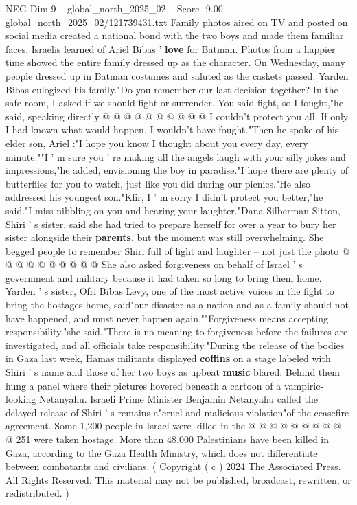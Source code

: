 \begin{textsample}{NEG Dim 9 – global\_north\_2025\_02 – Score -9.00 – global\_north\_2025\_02/121739431.txt}
Family photos aired on TV and posted on social media created a national bond with the two boys and made them familiar faces.
Israelis learned of Ariel Bibas ' \textbf{love} for Batman.
Photos from a happier time showed the entire family dressed up as the character.
On Wednesday, many people dressed up in Batman costumes and saluted as the caskets passed.
Yarden Bibas eulogized his family."Do you remember our last decision together?
In the safe room, I asked if we should fight or surrender.
You said fight, so I fought,"he said, speaking directly @ @ @ @ @ @ @ @ @ @ I couldn't protect you all.
If only I had known what would happen, I wouldn't have fought."Then he spoke of his elder son, Ariel :"I hope you know I thought about you every day, every minute.""I ' m sure you ' re making all the angels laugh with your silly jokes and impressions,"he added, envisioning the boy in paradise."I hope there are plenty of butterflies for you to watch, just like you did during our picnics."He also addressed his youngest son."Kfir, I ' m sorry I didn't protect you better,"he said."I miss nibbling on you and hearing your laughter."Dana Silberman Sitton, Shiri ' s sister, said she had tried to prepare herself for over a year to bury her sister alongside their \textbf{parents}, but the moment was still overwhelming.
She begged people to remember Shiri full of light and laughter -- not just the photo @ @ @ @ @ @ @ @ @ @ She also asked forgiveness on behalf of Israel ' s government and military because it had taken so long to bring them home.
Yarden ' s sister, Ofri Bibas Levy, one of the most active voices in the fight to bring the hostages home, said"our disaster as a nation and as a family should not have happened, and must never happen again.""Forgiveness means accepting responsibility,"she said."There is no meaning to forgiveness before the failures are investigated, and all officials take responsibility."During the release of the bodies in Gaza last week, Hamas militants displayed \textbf{coffins} on a stage labeled with Shiri ' s name and those of her two boys as upbeat \textbf{music} blared.
Behind them hung a panel where their pictures hovered beneath a cartoon of a vampiric-looking Netanyahu.
Israeli Prime Minister Benjamin Netanyahu called the delayed release of Shiri ' s remains a"cruel and malicious violation"of the ceasefire agreement.
Some 1,200 people in Israel were killed in the @ @ @ @ @ @ @ @ @ @ 251 were taken hostage.
More than 48,000 Palestinians have been killed in Gaza, according to the Gaza Health Ministry, which does not differentiate between combatants and civilians. ( Copyright ( c ) 2024 The Associated Press.
All Rights Reserved.
This material may not be published, broadcast, rewritten, or redistributed. )

\end{textsample}
